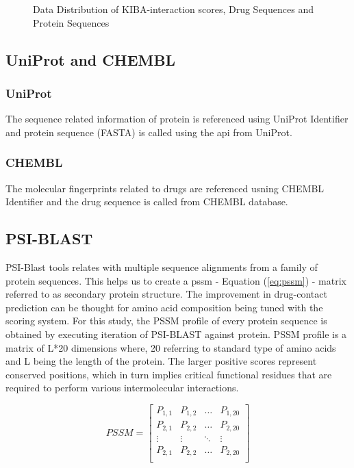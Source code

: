 \begin{figure}
         \caption[Dataset Distribution]{Data Distribution of KIBA-interaction scores, Drug Sequences and Protein Sequences}
         \label{fig:kiba_drug_protein}
\end{figure}

\subsection{UniProt and CHEMBL }

\subsubsection{UniProt} 
The sequence related information of protein is referenced using UniProt Identifier and protein sequence (FASTA) is called using the api from UniProt. \cite{UniProtConsortium2018}


\subsubsection{CHEMBL}
The molecular fingerprints related to drugs are referenced usning CHEMBL Identifier and the drug sequence is called from CHEMBL database. \cite{Gaulton2017}

\subsection{PSI-BLAST}
PSI-Blast tools relates with multiple sequence alignments from a family of protein sequences\cite{Schaffer2001}. This helps us to create a \acrshort{pssm} - Equation (\ref{eq:pssm}) - matrix referred to as secondary protein structure. The improvement in drug-contact prediction can be thought for amino acid composition being tuned with the scoring system. For this study, the PSSM profile of every protein sequence is obtained by executing iteration of PSI-BLAST against \cite[KEGG]{Schaffer2001} protein. PSSM profile is a matrix of L*20 dimensions where, 20 referring to standard type of amino acids and L being the length of the protein. The larger positive scores represent conserved positions, which in turn implies critical functional residues that are required to perform various intermolecular interactions.\cite[PSSM]{Schaffer2001}

\begin{equation}
  PSSM = \begin{bmatrix}
    P_{1,1} & P_{1,2} & \dots & P_{1,20} \\
    P_{2,1} & P_{2,2} & \dots & P_{2,20} \\
    \vdots  & \vdots  & \ddots & \vdots \\
    P_{2,1} & P_{2,2} & \dots & P_{2,20} \\
  \end{bmatrix}
  \label{eq:pssm}
\end{equation}

